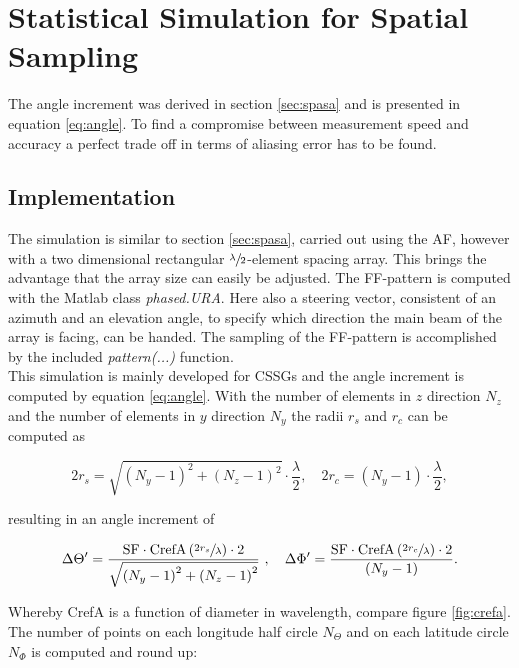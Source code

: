 \chapter{Statistical Simulation for Spatial Sampling}

The angle increment was derived in section \ref{sec:spasa} and is presented in equation \ref{eq:angle}. To find a compromise between measurement speed and accuracy a perfect trade off in terms of aliasing error has to be found.

\section{Implementation}

The simulation is similar to section \ref{sec:spasa}, carried out using the \ac{AF}, however with a two dimensional rectangular $\sfrac{\lambda}{2}$-element spacing array. This brings the advantage that the array size can easily be adjusted. The \ac{FF}-pattern is computed with the Matlab\texttrademark{} class \textit{phased.URA}. Here also a steering vector, consistent of an azimuth and an elevation angle, to specify which direction the main beam of the array is facing, can be handed. The sampling of the \ac{FF}-pattern is accomplished by the included \textit{pattern(...)} function.\\
This simulation is mainly developed for \acp{CSSG} and the angle increment is computed by equation \ref{eq:angle}. With the number of elements in $z$ direction $N_z$ and the number of elements in $y$ direction $N_y$ the radii $r_s$ and $r_c$ can be computed as

\begin{equation}
2r_s = \sqrt{\left(N_y-1\right)^2+\left(N_z-1\right)^2}\cdot\frac{\lambda}{2},\quad 2r_c=\left(N_y-1\right)\cdot\frac{\lambda}{2},
\end{equation}

resulting in an angle increment of

\begin{equation}
\Delta\Theta^\prime = \frac{\text{SF}\cdot\text{CrefA}\left(\sfrac{2r_s}{\lambda}\right)\cdot 2}{\sqrt{\left(N_y-1\right)^2+\left(N_z-1\right)^2}}\ ,\quad\Delta\Phi^\prime = \frac{\text{SF}\cdot\text{CrefA}\left(\sfrac{2r_c}{\lambda}\right)\cdot 2}{\left(N_y-1\right)}.
\end{equation}

Whereby \ac{CrefA} is a function of diameter in wavelength, compare figure \ref{fig:crefa}. The number of points on each longitude half circle $N_\Theta$ and on each latitude circle $N_\Phi$ is computed and round up:

